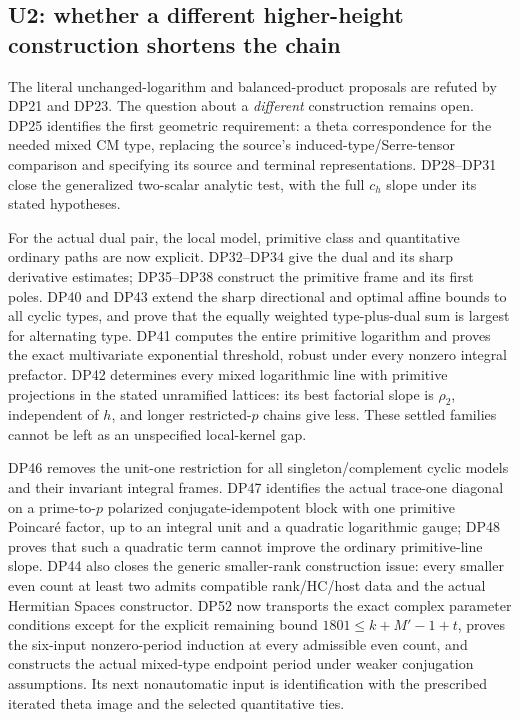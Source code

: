 \documentclass[11pt,a4paper]{article}
\theoremstyle{definition}\newtheorem{remark}[theorem]{Remark}
\begin{document}
\subsection{U2: whether a different higher-height construction shortens the chain}

The literal unchanged-logarithm and balanced-product proposals are refuted by DP21 and DP23. The question about a \emph{different} construction remains open. DP25 identifies the first geometric requirement: a theta correspondence for the needed mixed CM type, replacing the source's induced-type/Serre-tensor comparison and specifying its source and terminal representations. DP28--DP31 close the generalized two-scalar analytic test, with the full $c_h$ slope under its stated hypotheses.

For the actual dual pair, the local model, primitive class and quantitative ordinary paths are now explicit. DP32--DP34 give the dual and its sharp derivative estimates; DP35--DP38 construct the primitive frame and its first poles. DP40 and DP43 extend the sharp directional and optimal affine bounds to all cyclic types, and prove that the equally weighted type-plus-dual sum is largest for alternating type. DP41 computes the entire primitive logarithm and proves the exact multivariate exponential threshold, robust under every nonzero integral prefactor. DP42 determines every mixed logarithmic line with primitive projections in the stated unramified lattices: its best factorial slope is $\rho_2$, independent of $h$, and longer restricted-$p$ chains give less. These settled families cannot be left as an unspecified local-kernel gap.

DP46 removes the unit-one restriction for all singleton/complement cyclic models and their invariant integral frames. DP47 identifies the actual trace-one diagonal on a prime-to-$p$ polarized conjugate-idempotent block with one primitive Poincar\'e factor, up to an integral unit and a quadratic logarithmic gauge; DP48 proves that such a quadratic term cannot improve the ordinary primitive-line slope. DP44 also closes the generic smaller-rank construction issue: every smaller even count at least two admits compatible rank/HC/host data and the actual Hermitian Spaces constructor. DP52 now transports the exact complex parameter conditions except for the explicit remaining bound $1801\le k+M'-1+t$, proves the six-input nonzero-period induction at every admissible even count, and constructs the actual mixed-type endpoint period under weaker conjugation assumptions. Its next nonautomatic input is identification with the prescribed iterated theta image and the selected quantitative ties.
\end{document}
